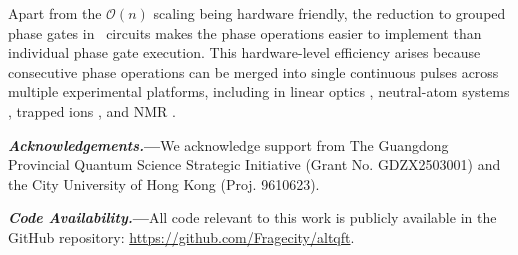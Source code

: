 \documentclass[reprint, aps, prl, superscriptaddress]{revtex4-2}
\renewcommand{\section}[1]{\par\medskip\noindent\textbf{{\textit{#1.}---}}}
\newcommand{\myqc}{\text{HP}}
\begin{document}
Apart from the $\mathcal{O}(n)$ scaling being hardware friendly, the reduction to grouped phase gates in \myqc~circuits makes the phase operations easier to implement than individual phase gate execution. This hardware-level efficiency arises because consecutive phase operations can be merged into single continuous pulses across multiple experimental platforms, including in linear optics \cite{carolan2015universal, Kok2007}, neutral-atom systems \cite{saffman2010quantum, evered2023high, mohan2025parametrized}, trapped ions \cite{Leibfried2003, Tan2013}, and NMR \cite{vandersypen2004nmr}.

\section{Acknowledgements}We acknowledge support from The Guangdong Provincial Quantum Science Strategic Initiative (Grant No. GDZX2503001) and the City University of Hong Kong (Proj. 9610623).
\section{Code Availability}All code relevant to this work is publicly available in the GitHub repository: \url{https://github.com/Fragecity/altqft}.



\end{document}
